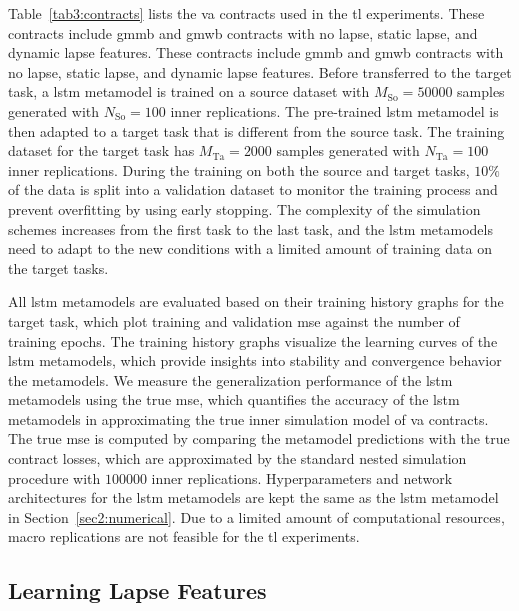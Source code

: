 Table~\ref{tab3:contracts} lists the \gls{va} contracts used in the \gls{tl} experiments.
These contracts include \gls{gmmb} and \gls{gmwb} contracts with no lapse, static lapse, and dynamic lapse features.
These contracts include \gls{gmmb} and \gls{gmwb} contracts with no lapse, static lapse, and dynamic lapse features.
Before transferred to the target task, a \gls{lstm} metamodel is trained on a source dataset with $M_{\text{So}} = \num{50000}$ samples generated with $N_{\text{So}} = \num{100}$ inner replications\footnotemark.
The pre-trained \gls{lstm} metamodel is then adapted to a target task that is different from the source task.
The training dataset for the target task has $M_{\text{Ta}} = \num{2000}$ samples generated with $N_{\text{Ta}} = \num{100}$ inner replications.
During the training on both the source and target tasks, $10\%$ of the data is split into a validation dataset to monitor the training process and prevent overfitting by using early stopping.
The complexity of the simulation schemes increases from the first task to the last task, and the \gls{lstm} metamodels need to adapt to the new conditions with a limited amount of training data on the target tasks.

All \gls{lstm} metamodels are evaluated based on their training history graphs for the target task, which plot training and validation \gls{mse} against the number of training epochs.
The training history graphs visualize the learning curves of the \gls{lstm} metamodels, which provide insights into stability and convergence behavior the metamodels.
We measure the generalization performance of the \gls{lstm} metamodels using the true \gls{mse}, which quantifies the accuracy of the \gls{lstm} metamodels in approximating the true inner simulation model of \gls{va} contracts.
The true \gls{mse} is computed by comparing the metamodel predictions with the true contract losses, which are approximated by the standard nested simulation procedure with $\num{100000}$ inner replications.
Hyperparameters and network architectures for the \gls{lstm} metamodels are kept the same as the \gls{lstm} metamodel in Section~\ref{sec2:numerical}. 
Due to a limited amount of computational resources, macro replications are not feasible for the \gls{tl} experiments.


\subsection{Learning Lapse Features}

